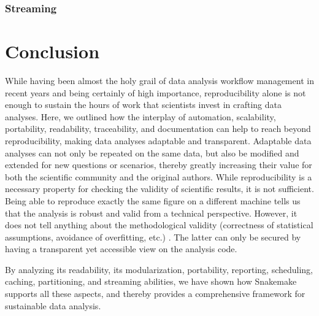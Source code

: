 \documentclass[parskip=half]{scrartcl}
\begin{document}
\subsubsection{Streaming}

\section{Conclusion}

While having been almost the holy grail of data analysis workflow management in recent years and being certainly of high importance, reproducibility alone is not enough to sustain the hours of work that scientists invest in crafting data analyses.
Here, we outlined how the interplay of automation, scalability, portability, readability, traceability, and documentation can help to reach beyond reproducibility, making data analyses adaptable and transparent.
Adaptable data analyses can not only be repeated on the same data, but also be modified and extended for new questions or scenarios, thereby greatly increasing their value for both the scientific community and the original authors.
While reproducibility is a necessary property for checking the validity of scientific results, it is not sufficient.
Being able to reproduce exactly the same figure on a different machine tells us that the analysis is robust and valid from a technical perspective.
However, it does not tell anything about the methodological validity (correctness of statistical assumptions, avoidance of overfitting, etc.)
.
The latter can only be secured by having a transparent yet accessible view on the analysis code.

By analyzing its readability, its modularization, portability, reporting, scheduling, caching, partitioning, and streaming abilities, we have shown how Snakemake supports all these aspects, and thereby provides a comprehensive framework for sustainable data analysis.

\printbibliography
\end{document}

